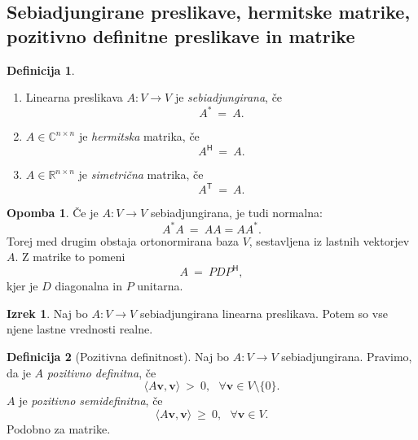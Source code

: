 \documentclass[11pt]{article}
\newcommand{\R}{\mathbb{R}}
\newcommand{\vv}{\mathbf{v}}
\newcommand{\0}{\mathbf{0}}
\renewcommand{\sp}[2]{\langle #1, #2 \rangle}
\newcommand{\T}{\mathsf{T}}
\renewcommand{\H}{\mathsf{H}}
\theoremstyle{definition}
\newtheorem{definicija}{Definicija}[section]
\theoremstyle{definition}
\theoremstyle{definition}
\newtheorem{izrek}{Izrek}[section]
\theoremstyle{definition}
\newtheorem*{opomba}{Opomba}
\begin{document}

\subsection{Sebiadjungirane preslikave, hermitske matrike, pozitivno definitne preslikave in matrike}
\vspace{0.5cm}

\begin{definicija}
~
\begin{enumerate}

\item Linearna preslikava $A: V \rightarrow V$ je \textit{sebiadjungirana}, če
$$A^* ~=~ A.$$

\item $A \in \mathbb{C}^{n \times n}$ je \textit{hermitska} matrika, če
$$A^\H ~=~ A.$$

\item $A \in \R^{n \times n}$ je \textit{simetrična} matrika, če
$$A^\T ~=~ A.$$

\end{enumerate}

\end{definicija}
\vspace{0.5cm}

\begin{opomba}

Če je $A: V \rightarrow V$ sebiadjungirana, je tudi normalna:
$$A^*A ~=~ AA = AA^*.$$
Torej med drugim obstaja ortonormirana baza $V$, sestavljena iz lastnih vektorjev $A$. Z matrike to pomeni
$$A ~=~ PDP^\H,$$
kjer je $D$ diagonalna in $P$ unitarna.

\end{opomba}
\vspace{0.5cm}

\begin{izrek}

Naj bo $A: V \rightarrow V$ sebiadjungirana linearna preslikava. Potem so vse njene lastne vrednosti realne.

\end{izrek}
\vspace{0.5cm}

\begin{definicija}[Pozitivna definitnost]

Naj bo $A: V \rightarrow V$ sebiadjungirana. Pravimo, da je $A$ \textit{pozitivno definitna}, če
$$\sp{A\vv}{\vv} ~>~ 0, ~~~\forall \vv \in V \setminus \{0\}.$$
$A$ je \textit{pozitivno semidefinitna}, če
$$\sp{A\vv}{\vv} ~\geq~ 0, ~~~\forall \vv \in V.$$
Podobno za matrike.

\end{definicija}
\vspace{0.5cm}
\end{document}
